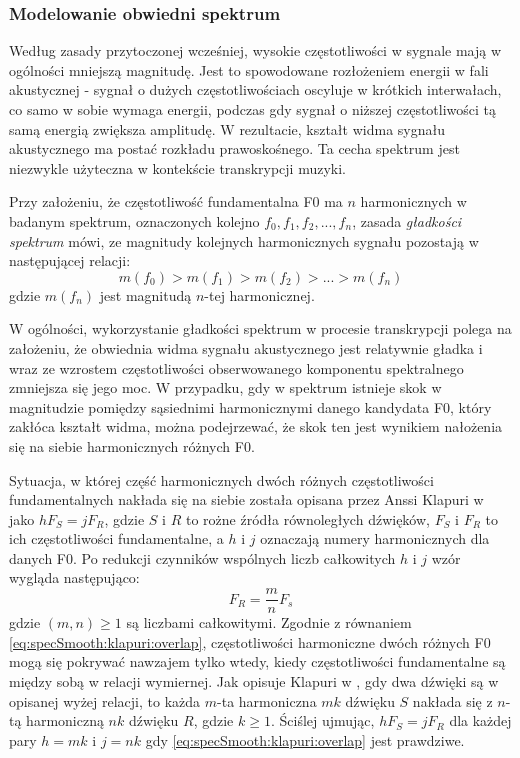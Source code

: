 \documentclass[12pt,a4paper,twoside]{mwart}
\begin{document}
\subsubsection{Modelowanie obwiedni spektrum}\label{sec:specSmoothnes}
Według zasady przytoczonej wcześniej, wysokie częstotliwości w sygnale mają w ogólności mniejszą magnitudę. Jest to spowodowane rozłożeniem energii w fali akustycznej - sygnał o dużych częstotliwościach oscyluje w krótkich interwałach, co samo w sobie wymaga energii, podczas gdy sygnał o niższej częstotliwości tą samą energią zwiększa amplitudę. W rezultacie, kształt widma sygnału akustycznego ma postać rozkładu prawoskośnego. Ta cecha spektrum jest niezwykle użyteczna w kontekście transkrypcji muzyki.

Przy założeniu, że częstotliwość fundamentalna F0 ma $n$ harmonicznych w badanym spektrum, oznaczonych kolejno $f_0, f_1, f_2, ..., f_n$, zasada \textit{gładkości spektrum} mówi, ze magnitudy kolejnych harmonicznych sygnału pozostają w następującej relacji:
\begin{equation}\label{eq:specSmooth:principle}
  m(f_0) > m(f_1) > m(f_2) > ... > m(f_n)
\end{equation}
gdzie $m(f_n)$ jest magnitudą $n$-tej harmonicznej.

W ogólności, wykorzystanie gładkości spektrum w procesie transkrypcji polega na założeniu, że obwiednia widma sygnału akustycznego jest relatywnie gładka i wraz ze wzrostem częstotliwości obserwowanego komponentu spektralnego zmniejsza się jego moc. W przypadku, gdy w spektrum istnieje skok w magnitudzie pomiędzy sąsiednimi harmonicznymi danego kandydata F0, który zakłóca kształt widma, można podejrzewać, że skok ten jest wynikiem nałożenia się na siebie harmonicznych różnych F0.


Sytuacja, w której część harmonicznych dwóch różnych częstotliwości fundamentalnych nakłada się na siebie została opisana przez Anssi Klapuri w \cite[3382]{Transcription:Klapuri:MultipitchEstimationAndSeparation} jako $hF_S = jF_R$, gdzie $S$ i $R$ to rożne źródła równoległych dźwięków, $F_S$ i $F_R$ to ich częstotliwości fundamentalne, a $h$ i $j$ oznaczają numery harmonicznych dla danych F0. Po redukcji czynników wspólnych liczb całkowitych $h$ i $j$ wzór wygląda następująco:
\begin{equation}\label{eq:specSmooth:klapuri:overlap}
  F_R = \frac{m}{n}F_s
\end{equation}
gdzie $(m, n) \geqslant 1$ są liczbami całkowitymi. Zgodnie z równaniem \ref{eq:specSmooth:klapuri:overlap}, częstotliwości harmoniczne dwóch różnych F0 mogą się pokrywać nawzajem tylko wtedy, kiedy częstotliwości fundamentalne są między sobą w relacji wymiernej. Jak opisuje Klapuri w \cite[3382]{Transcription:Klapuri:MultipitchEstimationAndSeparation}, gdy dwa dźwięki są w opisanej wyżej relacji, to każda $m$-ta harmoniczna $mk$ dźwięku $S$ nakłada się z $n$-tą harmoniczną $nk$ dźwięku $R$, gdzie $k \geqslant 1$. Ściślej ujmując, $hF_S = jF_R$ dla każdej pary $h=mk$ i $j=nk$ gdy \ref{eq:specSmooth:klapuri:overlap} jest prawdziwe.
\end{document}
